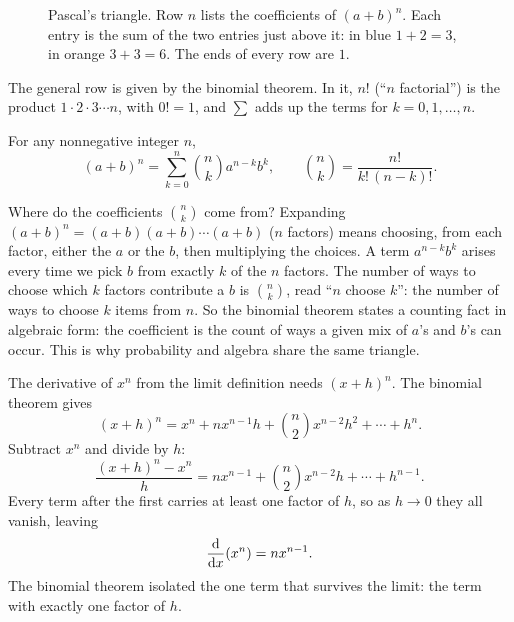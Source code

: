 \begin{figure}[htbp]
\centering
{}
\caption{Pascal's triangle. Row $n$ lists the coefficients of $(a+b)^n$. Each
entry is the sum of the two entries just above it: in blue $1+2=3$, in orange
$3+3=6$. The ends of every row are $1$.}
\label{ch40:fig-pascal}
\end{figure}

The general row is given by the binomial theorem. In it, $n!$ (``$n$
factorial'') is the product $1\cdot2\cdot3\cdots n$, with $0!=1$, and $\sum$
adds up the terms for $k=0,1,\dots,n$.

\begin{theorem}
\label{ch40:thm-binomial}
For any nonnegative integer $n$,
\[
  (a+b)^n = \sum_{k=0}^{n} \binom{n}{k} a^{n-k} b^{k},
  \qquad \binom{n}{k} = \frac{n!}{k!\,(n-k)!}.
\]
\end{theorem}

\begin{happeningbox}
Where do the coefficients $\binom{n}{k}$ come from? Expanding $(a+b)^n =
(a+b)(a+b)\cdots(a+b)$ ($n$ factors) means choosing, from each factor, either the
$a$ or the $b$, then multiplying the choices. A term $a^{n-k}b^k$ arises every time
we pick $b$ from exactly $k$ of the $n$ factors. The number of ways to choose which
$k$ factors contribute a $b$ is $\binom{n}{k}$, read ``$n$ choose $k$'': the
number of ways to choose $k$ items from $n$. So the
binomial theorem states a counting fact in algebraic form: the
coefficient is the count of ways a given mix of $a$'s and $b$'s can occur. This is
why probability and algebra share the same triangle.
\end{happeningbox}

\begin{example}
\label{ch40:ex-binom-power}
The derivative of $x^n$ from the limit definition needs $(x+h)^n$. The binomial
theorem gives
\[
  (x+h)^n = x^n + n x^{n-1} h + \binom{n}{2} x^{n-2} h^2 + \cdots + h^n.
\]
Subtract $x^n$ and divide by $h$:
\[
  \frac{(x+h)^n - x^n}{h} = n x^{n-1} + \binom{n}{2}x^{n-2} h + \cdots + h^{n-1}.
\]
Every term after the first carries at least one factor of $h$, so as $h \to 0$ they
all vanish, leaving
\[
  \frac{\mathrm{d}}{\mathrm{d} x}\!\left(x^n\right) = n x^{n-1}.
\]
The binomial theorem isolated the one term that survives the limit: the term
with exactly one factor of $h$.
\end{example}

